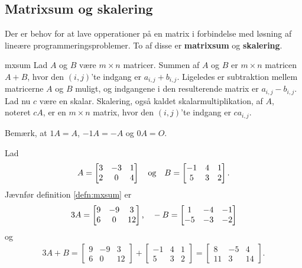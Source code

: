 \subsection{Matrixsum og skalering}
% 
Der er behov for at lave opperationer på en matrix i forbindelse med løsning af lineære programmeringsproblemer. 
To af disse er \textbf{matrixsum} og \textbf{skalering}.
%
\begin{defn}{}{mxsum}
Lad $A$ og $B$ være $m \times n$ matricer.
Summen af $A$ og $B$ er $m \times n$ matricen $A + B$, hvor den $(i,j)$'te indgang er $a_{i,j} + b_{i,j}$.
Ligeledes er subtraktion mellem matricerne $A$ og $B$ muligt, og indgangene i den resulterende matrix er $a_{i,j} - b_{i,j}$.
\\
Lad nu $c$ være en skalar.
Skalering, også kaldet skalarmultiplikation, af $A$, noteret $cA$, er en $m \times n$ matrix, hvor den $(i,j)$'te indgang er $ca_{i,j}$.
\end{defn}
\noindent
%
Bemærk, at $1A = A$, $-1A = -A$ og $0A = O$.
\\
%
\begin{eks}
Lad 
\begin{align*}
A= 
\begin{bmatrix}
3	&	-3	&	1\\
2	&	0	&	4
\end{bmatrix}
\text{\phantom{---}og\phantom{---}}
B= 
\begin{bmatrix}
-1	&	4	&	1\\
5	&	3	&	2
\end{bmatrix}.
\end{align*}
Jævnfør definition \ref{defn:mxsum} er
\begin{align*}
3A= 
\begin{bmatrix}
9	&	-9	&	3\\
6	&	0	&	12
\end{bmatrix}
\text{,\phantom{---}}
-B= 
\begin{bmatrix}
1	&	-4	&	-1\\
-5	&	-3	&	-2
\end{bmatrix}
\end{align*}
og
\begin{align*}
3A+B= 
\begin{bmatrix}
9	&	-9	&	3\\
6	&	0	&	12
\end{bmatrix}
+ 
\begin{bmatrix}
-1	&	4	&	1\\
5	&	3	&	2
\end{bmatrix}
=
\begin{bmatrix}
8	&	-5	&	4\\
11	&	3	&	14
\end{bmatrix}.
\end{align*}
\end{eks}

